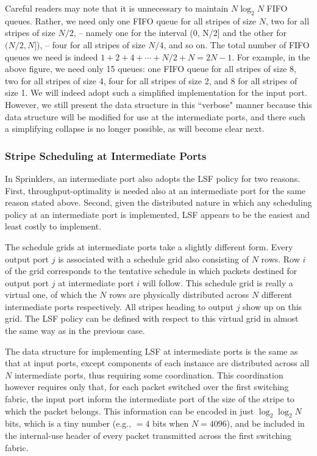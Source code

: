 Careful readers may note that it is unnecessary to maintain $N \log_2 N$ FIFO queues.  Rather, we need only one FIFO queue for all 
stripes of size $N$, two for all stripes of size $N/2$, -- namely one for the interval (0, N/2] and the other for $(N/2, N]$), -- four for all stripes of size
$N/4$, and so on.  The total number of FIFO queues we need is indeed $1 + 2 + 4 + \cdots + N/2 + N = 2N-1$.  
For example, in the above figure, we need only 15 queues: one FIFO queue for all stripes of size 8, two for all stripes of size 4, 
four for all stripes of size 2, and 8 for all stripes of size 1.  We will indeed adopt such a simplified implementation for the 
input port.  However, we still present the data structure in this ``verbose" manner because this data structure will be modified for use at
the intermediate ports, and there such a simplifying collapse is no longer possible, as will become clear next.








\subsubsection{Stripe Scheduling at Intermediate Ports}
\label{sec:scheduling intermediate}

In Sprinklers, an intermediate port also adopts the LSF policy for two reasons.  First, throughput-optimality is needed also at an intermediate port for the same reason stated above.  Second, given the distributed nature
in which any scheduling policy at an intermediate port is implemented, LSF 
appears to be the easiest and least costly to implement.


The schedule grids at intermediate ports take a slightly different form.
Every output port $j$ is associated with a schedule grid also consisting of $N$ rows. 
Row $i$ of the grid corresponds to the tentative schedule in which packets destined for output port 
$j$ at intermediate port $i$ will follow.  This schedule grid is really a virtual one, of which the $N$ rows are physically distributed across $N$ different intermediate ports respectively.  All stripes heading to output 
$j$ show up on this grid.  The LSF policy can be defined with respect to this virtual grid in 
almost the same way as in the previous case.  

The data structure for implementing LSF at intermediate ports is the same as that at input ports, except 
components of each instance are distributed across all $N$ intermediate ports, thus requiring some 
coordination.  This coordination however requires only that, for each packet switched over the first switching fabric, 
the input port inform the intermediate port of the size of the stripe to which the packet belongs.  This 
information can be encoded in just $\log_2 \log_2 N$ bits, which is a tiny number (e.g., $=4$ bits 
when $N = 4096$), and be included in the internal-use header
of every packet transmitted across the first switching fabric.




